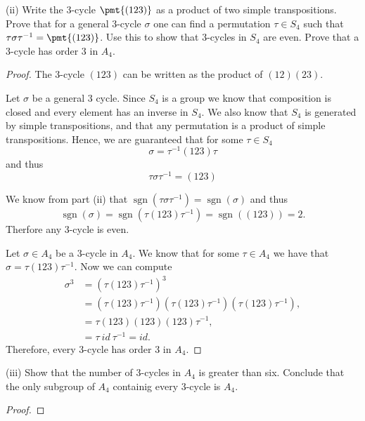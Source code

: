 \documentclass{article}
\DeclareMathOperator*{\sgn}{sgn}
\newenvironment{hwproof}[1]
{
    #1
    \begin{proof}
}{
    \end{proof}
}
\begin{document}
\begin{hwproof}
    {
        (ii) Write the 3-cycle $\pmt{(123)}$ as a product of two simple transpositions.
        Prove that for a general 3-cycle $\sigma$ one can find a permutation
        $\tau \in S_4$ such that $\tau \sigma \tau^{-1} = \pmt{(123)}$. Use this to show
        that 3-cycles in $S_4$ are even. Prove that a 3-cycle has order 3 in $A_4$.
    }

    The 3-cycle $(123)$ can be written as the product of $(12)(23)$.

    Let $\sigma$ be a general 3 cycle. Since
    $S_4$ is a group we know that composition is closed and every element has an inverse
    in $S_4$. We also know that $S_4$ is generated by simple transpositions, and
    that any permutation is a product of simple transpositions.
    Hence, we are guaranteed that for some $\tau \in S_4$
    \begin{equation*}
        \sigma = \tau^{-1} (123) \tau
    \end{equation*}
    and thus
    \begin{equation*}
        \tau \sigma \tau^{-1} = (123)
    \end{equation*}

    We know from part (ii) that $\sgn(\tau \sigma \tau^{-1}) = \sgn(\sigma)$ and
    thus
    \begin{equation*}
        \sgn(\sigma) = \sgn(\tau(123)\tau^{-1}) = \sgn((123)) = 2.
    \end{equation*}
    Therfore any 3-cycle is even.

    Let $\sigma \in A_4$ be a 3-cycle in $A_4$. We know that for some $\tau \in A_4$
    we have that $\sigma = \tau (123) \tau^{-1}$. Now we can compute
    \begin{align*}
        \sigma^3 & = (\tau (123) \tau^{-1})^3                                            \\
                 & = (\tau (123) \tau^{-1})(\tau (123) \tau^{-1})(\tau (123) \tau^{-1}), \\
                 & = \tau (123)(123)(123)\tau^{-1},                                      \\
                 & = \tau \ id \ \tau^{-1} = id.
    \end{align*}
    Therefore, every 3-cycle has order 3 in $A_4$.
\end{hwproof}

\begin{hwproof}
    {
        (iii) Show that the number of 3-cycles in $A_4$ is greater than six. Conclude
        that the only subgroup of $A_4$ containig every 3-cycle is $A_4$.
    }
\end{hwproof}
\end{document}
